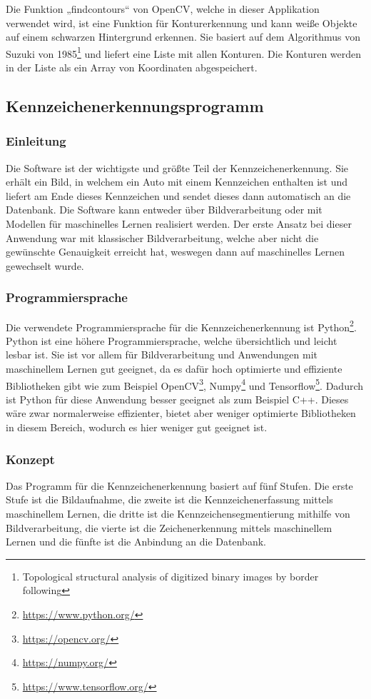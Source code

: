 Die Funktion „findcontours“ von OpenCV, welche in dieser Applikation verwendet wird, ist eine Funktion für Konturerkennung 
und kann weiße Objekte auf einem schwarzen Hintergrund erkennen. Sie basiert auf dem Algorithmus von Suzuki von 
1985\footnote{Topological structural analysis of digitized binary images by border following} und 
liefert eine Liste mit allen Konturen. Die Konturen werden in der Liste als ein Array von Koordinaten abgespeichert.

\subsection{Kennzeichenerkennungsprogramm}

\subsubsection{Einleitung}
Die Software ist der wichtigste und größte Teil der Kennzeichenerkennung. Sie erhält ein Bild, in welchem ein Auto mit 
einem Kennzeichen enthalten ist und liefert am Ende dieses Kennzeichen und sendet dieses dann automatisch an die Datenbank. 
Die Software kann entweder über Bildverarbeitung oder mit Modellen für maschinelles Lernen realisiert werden. Der erste Ansatz bei 
dieser Anwendung war mit klassischer Bildverarbeitung, welche aber nicht die gewünschte Genauigkeit erreicht hat, weswegen 
dann auf maschinelles Lernen gewechselt wurde.

\subsubsection{Programmiersprache}
Die verwendete Programmiersprache für die Kennzeichenerkennung ist Python\footnote{\url{https://www.python.org/}}. Python ist eine höhere Programmiersprache, 
welche übersichtlich und leicht lesbar ist. Sie ist vor allem für Bildverarbeitung und Anwendungen mit maschinellem Lernen gut geeignet, 
da es dafür hoch optimierte und effiziente Bibliotheken gibt wie zum Beispiel OpenCV\footnote{\url{https://opencv.org/}}, Numpy\footnote{\url{https://numpy.org/}} und Tensorflow\footnote{\url{https://www.tensorflow.org/}}. Dadurch ist Python 
für diese Anwendung besser geeignet als zum Beispiel C++. Dieses wäre zwar normalerweise effizienter, bietet aber weniger 
optimierte Bibliotheken in diesem Bereich, wodurch es hier weniger gut geeignet ist.

\subsubsection{Konzept}
Das Programm für die Kennzeichenerkennung basiert auf fünf Stufen. Die erste Stufe ist die Bildaufnahme, die zweite ist die 
Kennzeichenerfassung mittels maschinellem Lernen, die dritte ist die Kennzeichensegmentierung mithilfe von Bildverarbeitung, 
die vierte ist die Zeichenerkennung mittels maschinellem Lernen und die fünfte ist die Anbindung an die Datenbank.

